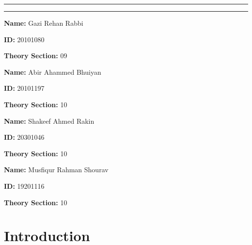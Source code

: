 \documentclass{article}
\begin{document}
\begin{titlepage}
\begin{center}
	\rule{\textwidth}{0.4pt}\vspace*{-\baselineskip}\vspace{3.2pt} %
	\rule{\textwidth}{1.6pt} %
	
	\vspace{2\baselineskip} %

    \end{center}

    \vspace{1.5cm}


\renewcommand{\baselinestretch}{1.2}%

    \Large{
    \begin{minipage}[t]{0.55\linewidth}
        {\bf Name:}
        Gazi Rehan Rabbi

        {\bf ID:}
        20101080
        
        {\bf Theory Section:}
        09

        \vspace{1cm}

        {\bf Name:}
        Abir Ahammed Bhuiyan

        {\bf ID:}
        20101197
        
        {\bf Theory Section:}
        10

    \end{minipage}\hfill
    \begin{minipage}[t]{0.55\linewidth}

        {\bf Name:}
        Shakeef Ahmed Rakin

        {\bf ID:}
        20301046
        
        {\bf Theory Section:}
        10

        \vspace{1cm}


        {\bf Name:}
        Musfiqur Rahman Shourav

        {\bf ID:}
        19201116
        
        {\bf Theory Section:}
        10

    \end{minipage}
    }


\end{titlepage}

\renewcommand{\baselinestretch}{1}%

\newpage

\section{Introduction}
\end{document}
